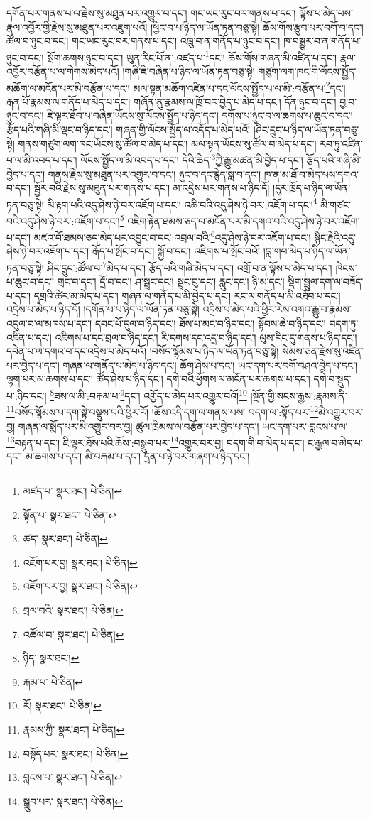 དགོན་པར་གནས་པ་ལ་རྗེས་སུ་མཐུན་པར་འགྱུར་བ་དང་། གང་ཡང་རུང་བར་གནས་པ་དང་། ལྟོས་པ་མེད་པས་རྣལ་འབྱོར་གྱི་རྗེས་སུ་མཐུན་པར་འཇུག་པའོ། །ཕྱིང་བ་པ་ཉིད་ལ་ཡོན་ཏན་བཅུ་སྟེ། ཆོས་གོས་རྩུབ་པར་བགོ་བ་དང་། ཚོལ་བ་ཉུང་བ་དང་། གང་ཡང་རུང་བར་གནས་པ་དང་། འཁྲུ་བ་ན་གནོད་པ་ཉུང་བ་དང་། ཁ་བསྒྱུར་བ་ན་གནོད་པ་ཉུང་བ་དང་། སྲོག་ཆགས་ཉུང་བ་དང་། ཡུན་རིང་པོ་ན་:འཛད་པ་\footnote{མཛད་པ་  སྣར་ཐང་།  པེ་ཅིན། }དང་། ཆོས་གོས་གཞན་མི་འཛིན་པ་དང་། རྣལ་འབྱོར་བརྩོན་པ་ལ་གེགས་མེད་པའོ། །གཞི་ཇི་བཞིན་པ་ཉིད་ལ་ཡོན་ཏན་བཅུ་སྟེ། གཙུག་ལག་ཁང་གི་ལོངས་སྤྱོད་མཆོག་ལ་མངོན་པར་མི་བརྩོན་པ་དང་། མལ་སྟན་མཆོག་འཛིན་པ་དང་ལོངས་སྤྱོད་པ་ལ་མི་:བརྩོན་པ་\footnote{སྟོན་པ་  སྣར་ཐང་།  པེ་ཅིན། }དང་། རྒན་པོ་རྣམས་ལ་གནོད་པ་མེད་པ་དང་། གཞོན་ནུ་རྣམས་ལ་ཁྲོ་བར་བྱེད་པ་མེད་པ་དང་། དོན་ཉུང་བ་དང་། བྱ་བ་ཉུང་བ་དང་། ཇི་ལྟར་ཐོབ་པ་བཞིན་ཡོངས་སུ་ལོངས་སྤྱོད་པ་ཉིད་དང་། དགོས་པ་ཉུང་བ་ལ་ཆགས་པ་ཆུང་བ་དང་། རྩོད་པའི་གཞི་མི་ལྡང་བ་ཉིད་དང་། གཞན་གྱི་ལོངས་སྤྱོད་ལ་འདོད་པ་མེད་པའོ། །ཤིང་དྲུང་པ་ཉིད་ལ་ཡོན་ཏན་བཅུ་སྟེ། གནས་གཙུག་ལག་ཁང་ཡོངས་སུ་ཚོལ་བ་མེད་པ་དང་། མལ་སྟན་ཡོངས་སུ་ཚོལ་བ་མེད་པ་དང་། རབ་ཏུ་འཛིན་པ་ལ་མི་འབད་པ་དང་། ལོངས་སྤྱོད་ལ་མི་འབད་པ་དང་། དེའི་ཆེད་\footnote{ཚད་  སྣར་ཐང་།  པེ་ཅིན། }ཀྱི་རྒྱུ་མཚན་མི་བྱེད་པ་དང་། རྩོད་པའི་གཞི་མི་བྱེད་པ་དང་། གནས་རྗེས་སུ་མཐུན་པར་འགྱུར་བ་དང་། ཉུང་བ་དང་རྙེད་སླ་བ་དང་། ཁ་ན་མ་ཐོ་བ་མེད་པས་དགའ་བ་དང་། སྦྱོར་བའི་རྗེས་སུ་མཐུན་པར་གནས་པ་དང་། མ་འདྲེས་པར་གནས་པ་ཉིད་དོ། །དུར་ཁྲོད་པ་ཉིད་ལ་ཡོན་ཏན་བཅུ་སྟེ། མི་རྟག་པའི་འདུ་ཤེས་ཉེ་བར་འཇོག་པ་དང་། འཆི་བའི་འདུ་ཤེས་ཉེ་བར་:འཇོག་པ་དང་།\footnote{འཇོག་པར་བྱ།  སྣར་ཐང་།  པེ་ཅིན། } མི་གཙང་བའི་འདུ་ཤེས་ཉེ་བར་:འཇོག་པ་དང་།\footnote{འཇོག་པར་བྱ།  སྣར་ཐང་།  པེ་ཅིན། } འཇིག་རྟེན་ཐམས་ཅད་ལ་མངོན་པར་མི་དགའ་བའི་འདུ་ཤེས་ཉེ་བར་འཇོག་པ་དང་། མཛའ་བོ་ཐམས་ཅད་མེད་པར་འབྱུང་བ་དང་:འབྲལ་བའི་\footnote{བྲལ་བའི་  སྣར་ཐང་།  པེ་ཅིན། }འདུ་ཤེས་ཉེ་བར་འཇོག་པ་དང་། སྙིང་རྗེའི་འདུ་ཤེས་ཉེ་བར་འཇོག་པ་དང་། རྒོད་པ་སྤོང་བ་དང་། སྐྱོ་བ་དང་། འཇིགས་པ་སྤོང་བའོ། །བླ་གབ་མེད་པ་ཉིད་ལ་ཡོན་ཏན་བཅུ་སྟེ། ཤིང་དྲུང་:ཚོལ་བ་\footnote{འཚོལ་བ་  སྣར་ཐང་།  པེ་ཅིན། }མེད་པ་དང་། རྩོད་པའི་གཞི་མེད་པ་དང་། འགྲོ་བ་ན་ལྟོས་པ་མེད་པ་དང་། ཁེངས་པ་ཆུང་བ་དང་། གྲང་བ་དང་། དྲོ་བ་དང་། ཤ་སྦྲང་དང་། སྦྲང་བུ་དང་། རླུང་དང་། ཉི་མ་དང་། སྡིག་སྦྲུལ་དག་ལ་བཟོད་པ་དང་། དགྲའི་ཚེར་མ་མེད་པ་དང་། གཞན་ལ་གནོད་པ་མི་བྱེད་པ་དང་། རང་ལ་གནོད་པ་མི་འཐོབ་པ་དང་། འདྲེས་པ་མེད་པ་ཉིད་དོ། །དགོན་པ་པ་ཉིད་ལ་ཡོན་ཏན་བཅུ་སྟེ། འདྲིས་པ་མེད་པའི་ཕྱིར་རེས་འགའ་རྒྱུ་བ་རྣམས་འདུལ་བ་ལ་མཁས་པ་དང་། དབང་པོ་དུལ་བ་ཉིད་དང་། ཐོས་པ་མང་བ་ཉིད་དང་། སྟོབས་ཆེ་བ་ཉིད་དང་། བདག་ཏུ་འཛིན་པ་དང་། འཇིགས་པ་དང་བྲལ་བ་ཉིད་དང་། རི་དགས་དང་འདྲ་བ་ཉིད་དང་། ལུས་རིང་དུ་གནས་པ་ཉིད་དང་། དབེན་པ་ལ་དགའ་བ་དང་འདྲེས་པ་མེད་པའོ། །བསོད་སྙོམས་པ་ཉིད་ལ་ཡོན་ཏན་བཅུ་སྟེ། སེམས་ཅན་རྗེས་སུ་འཛིན་པར་བྱེད་པ་དང་། གཞན་ལ་གནོད་པ་མེད་པ་ཉིད་དང་། ཆོག་ཤེས་པ་དང་། ཡང་དག་པར་བགོ་བཤའ་བྱེད་པ་དང་། ལྷག་པར་མ་ཆགས་པ་དང་། ཚོད་ཤེས་པ་ཉིད་དང་། དགེ་བའི་ཕྱོགས་ལ་མངོན་པར་ཆགས་པ་དང་། དགེ་བ་སྡུད་པ་:ཉིད་དང་། \footnote{ཉིད་  སྣར་ཐང་། }ཟས་ལ་མི་:བརྐམ་པ་\footnote{རྐམ་པ་  པེ་ཅིན། }དང་། འགྱོད་པ་མེད་པར་འགྱུར་བའོ།\footnote{རོ།  སྣར་ཐང་།  པེ་ཅིན། } །སྔོན་གྱི་སངས་རྒྱས་:རྣམས་ནི་\footnote{རྣམས་ཀྱི་  སྣར་ཐང་།  པེ་ཅིན། }བསོད་སྙོམས་པ་དག་སྟེ་བསྡུས་པའི་ཕྱིར་རོ། །ཆོས་འདི་དག་ལ་གནས་པས། བདག་ལ་:སྟོད་པར་\footnote{བསྟོད་པར་  སྣར་ཐང་།  པེ་ཅིན། }མི་འགྱུར་བར་བྱ། གཞན་ལ་སྨོད་པར་མི་འགྱུར་བར་བྱ། ཚུལ་ཁྲིམས་ལ་བརྩོན་པར་བྱེད་པ་དང་། ཡང་དག་པར་:བླངས་པ་ལ་\footnote{བླངས་པ་  སྣར་ཐང་།  པེ་ཅིན། }བརྟན་པ་དང་། ཇི་ལྟར་ཐོས་པའི་ཆོས་:བསྒྲུབ་པར་\footnote{སྒྲུབ་པར་  སྣར་ཐང་།  པེ་ཅིན། }འགྱུར་བར་བྱ། བདག་གི་བ་མེད་པ་དང་། ང་རྒྱལ་བ་མེད་པ་དང་། མ་ཆགས་པ་དང་། མི་བརྐམ་པ་དང་། དྲན་པ་ཉེ་བར་གཞག་པ་ཉིད་དང་། 